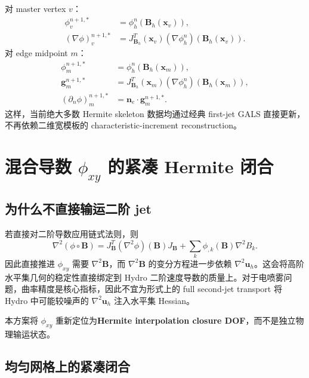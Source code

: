 \documentclass[11pt,a4paper]{ctexart}
\newcommand{\bx}{\bm{x}}
\newcommand{\bu}{\bm{u}}
\newcommand{\bn}{\bm{n}}
\newcommand{\bB}{\bm{B}}
\newcommand{\bg}{\bm{g}}
\newcommand{\grad}{\nabla}
\newcommand{\Hess}{\nabla^2}
\begin{document}
对 master vertex $v$：
\begin{align}
    \phi_v^{n+1,*}
    &=\phi_h^n(\bB_h(\bx_v)),
    \\
    (\grad\phi)_v^{n+1,*}
    &=J_{\bB_h}^{T}(\bx_v)
      (\grad\phi_h^n)(\bB_h(\bx_v)).
    \label{eq:vertex_gals}
\end{align}
对 edge midpoint $m$：
\begin{align}
    \phi_m^{n+1,*}
    &=\phi_h^n(\bB_h(\bx_m)),
    \\
    \bg_m^{n+1,*}
    &=J_{\bB_h}^{T}(\bx_m)
      (\grad\phi_h^n)(\bB_h(\bx_m)),
    \\
    (\partial_n\phi)_m^{n+1,*}
    &=\bn_e\cdot\bg_m^{n+1,*}.
    \label{eq:edge_gals}
\end{align}
这样，当前绝大多数 Hermite skeleton 数据均通过经典 first-jet GALS 直接更新，不再依赖二维宽模板的 characteristic-increment reconstruction。

\section{混合导数 $\phi_{xy}$ 的紧凑 Hermite 闭合}

\subsection{为什么不直接输运二阶 jet}

若直接对二阶导数应用链式法则，则
\begin{equation}
    \Hess(\phi\circ\bB)
    =J_{\bB}^{T}(\Hess\phi)(\bB)J_{\bB}
    +\sum_{k}\phi_{,k}(\bB)\Hess B_k.
    \label{eq:hessian_pullback}
\end{equation}
因此直接推进 $\phi_{xy}$ 需要 $\Hess\bB$，而 $\Hess\bB$ 的变分方程进一步依赖 $\nabla^2\bu_h$。这会将高阶水平集几何的稳定性直接绑定到 Hydro 二阶速度导数的质量上。对于电喷雾问题，曲率精度是核心指标，因此不宜为形式上的 full second-jet transport 将 Hydro 中可能较噪声的 $\nabla^2\bu_h$ 注入水平集 Hessian。

本方案将 $\phi_{xy}$ 重新定位为\textbf{Hermite interpolation closure DOF}，而不是独立物理输运状态。

\subsection{均匀网格上的紧凑闭合}
\end{document}
